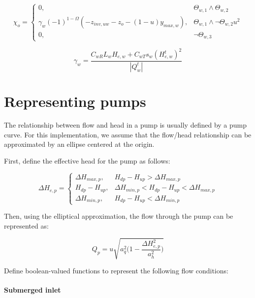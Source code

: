 \documentclass[11pt]{article}
\begin{document}
\begin{equation}
  \chi_{o} =
  \begin{cases}
   0, & \Theta_{w,1} \land \Theta_{w,2}\\
   \gamma_w (-1)^{1 - \Omega} (- z_{inv,uw} - z_o - (1 - u) y_{max,w}), & \Theta_{w,1} \land \lnot \Theta_{w,2} u^2\\
   0, & \lnot \Theta_{w,3}
  \end{cases}
\end{equation}

\begin{equation}
 \gamma_w = \frac{C_{wR} L_{w} H_{e,w} + C_{wT} s_{w} (H_{e,w}^{t})^2}{|Q_{w}^t|}
\end{equation}

\section{Representing pumps}

The relationship between flow and head in a pump is usually defined by a pump
curve. For this implementation, we assume that the flow/head relationship can be
approximated by an ellipse centered at the origin.

First, define the effective head for the pump as follows:

\begin{equation}
  \Delta H_{e,p} =
  \begin{cases}
    \Delta H_{max,p}, & H_{dp} - H_{up} > \Delta H_{max,p} \\
    H_{dp} - H_{up}, & \Delta H_{min,p} < H_{dp} - H_{up} < \Delta H_{max,p} \\
    \Delta H_{min,p}, & H_{dp} - H_{up} < \Delta H_{min,p}
  \end{cases}
\end{equation}

Then, using the elliptical approximation, the flow through the pump can be
represented as:

\begin{equation}
 Q_p = u \sqrt{a_q^2 \bigl( 1 - \frac{\Delta H_{e,p}^2}{a_h^2} \bigr)} 
\end{equation}

Define boolean-valued functions to represent the following flow conditions:

\paragraph{Submerged inlet}
\end{document}
